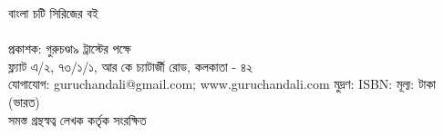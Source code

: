 \clearpage
\scriptsize
\raggedright 
বাংলা চটি সিরিজের বই\\
\textbf{\guruFullTitle}\\
\guruPublicationDetails
{}\baselineskip
প্রকাশক: গুরুচণ্ডা৯ ট্রাস্টের পক্ষে \guruPublisher \\
ফ্ল্যাট এ/২, ৭৩/১/১, আর কে চ্যাটার্জী রোড, কলকাতা - ৪২\\
যোগাযোগ: guruchandali@gmail.com; www.guruchandali.com
\baselineskip
মুদ্রণ: \guruPress
{}\baselineskip
\guruRobots 
{}\baselineskip
ISBN: \guruISBN
{}\baselineskip
মূল্য: \guruPrice টাকা (ভারত)\\
\baselineskip
সমস্ত গ্রন্থস্বত্ব লেখক কর্তৃক সংরক্ষিত
